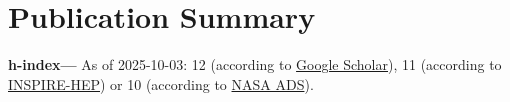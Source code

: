 \newcommand{\arxiv}[1]{[\href{http://arxiv.org/abs/#1}{arXiv:#1}]}
\def\zero{0}
\def\one{1}
\newcommand{\citeCount}[1]{%
  \def\val{#1}
  \ifx\val\zero%
  \else%
    \ifx\val\one%
    (1~citation)%
    \else%
    (#1~citations)%
    \fi%
  \fi}


\def\apj{Astrophys.\ J.}
\def\apjs{Astrophys.\ J.\ Suppl.\ Ser.}
\def\cqg{Class.\ Quantum\ Gravity}
\def\joss{J.\ Open\ Source\ Softw.}
\def\mnras{Mon.\ Not.\ R.\ Astron.\ Soc.}
\def\prd{Phys.\ Rev.\ D}
\def\prl{Phys.\ Rev.\ Lett.}


\setcounter{numPubs}{24}
\setcounter{pubCounter}{\value{numPubs}}


\newif\ifshowpubsummary
\showpubsummarytrue
\ifshowpubsummary
\section{Publication Summary}
\textbf{h-index---}%
As of 2025-10-03: 12 (according to
\href{https://scholar.google.com/citations?hl=en&user=jET8KxgAAAAJ}%
{Google Scholar}),
11 (according to
\href{https://inspirehep.net/authors/1798261?ui-citation-summary=true}%
{INSPIRE-HEP})
or 10 (according to
\href{https://ui.adsabs.harvard.edu/user/libraries/SDMGXaKoRomaOJsefpo2yQ}%
{NASA ADS}).

